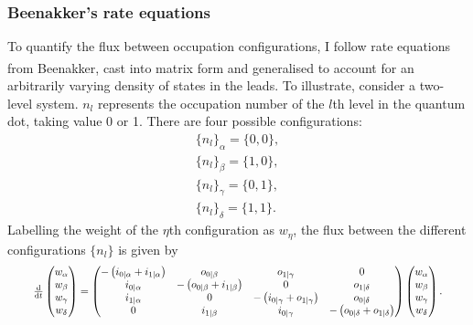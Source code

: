 \documentclass[a4paper,11pt]{article}
\let\oldcite\cite
\renewcommand{\cite}[1]{\textsuperscript{\oldcite{#1}}}
\begin{document}
    \subsubsection{Beenakker's rate equations}
    To quantify the flux between occupation configurations, I follow rate equations from Beenakker\cite{Beenakker-1991}, cast into matrix form and generalised to account for an arbitrarily varying density of states in the leads. To illustrate, consider a two-level system. $n_l$ represents the occupation number of the $l$th level in the quantum dot, taking value 0 or 1. There are four possible configurations:
    \begin{equation}\label{eqn:Two-level_configurations}\begin{aligned}
        \{n_l\}_\alpha = \{0,0\}, \\
        \{n_l\}_\beta  = \{1,0\}, \\
        \{n_l\}_\gamma = \{0,1\}, \\
        \{n_l\}_\delta = \{1,1\}.
    \end{aligned}\end{equation}
    Labelling the weight of the $\eta$th configuration as $w_\eta$, the flux between the different configurations $\{n_l\}$ is given by
    \begin{equation}\label{eqn:Rate_matrix}\resizebox{.93\hsize}{!}{$
        \frac{\mathrm{d}}{\mathrm{d} t} \left( \begin{matrix} w_\alpha \\ w_\beta \\ w_\gamma \\ w_\delta \end{matrix} \right)
      = \left( \begin{matrix}
                   -\left(i_{0|\alpha} + i_{1|\alpha}\right)
                 &  o_{0|\beta}
                 &  o_{1|\gamma}
                 &  0 \\
                    i_{0|\alpha}
                 & -\left(o_{0|\beta} + i_{1|\beta}\right)
                 &  0
                 &  o_{1|\delta} \\
                    i_{1|\alpha}
                 &  0
                 & -\left(i_{0|\gamma} + o_{1|\gamma}\right)
                 &  o_{0|\delta} \\
                    0
                 &  i_{1|\beta}
                 &  i_{0|\gamma}
                 & -\left(o_{0|\delta} + o_{1|\delta}\right)
               \end{matrix} \right)
        \left( \begin{matrix} w_\alpha \\ w_\beta \\ w_\gamma \\ w_\delta \end{matrix} \right).
    $}\end{equation}
\end{document}
